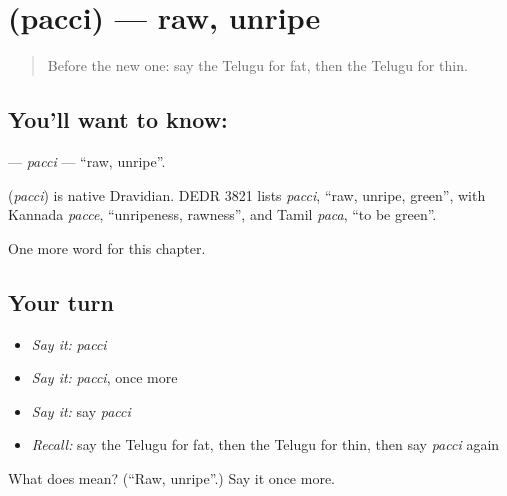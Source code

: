 \section[\texorpdfstring{\te{పచ్చి} (pacci)}{పచ్చి (pacci)}]{ (pacci) — raw, unripe}

\label{lesson:TE-C220-pacci}



\begin{quote}
Before the new one: say the Telugu for fat, then the Telugu for thin.
\end{quote}

\subsection*{You'll want to know: }
\textbf{} — \emph{pacci} — \textquotedblleft{}raw, unripe\textquotedblright{}.

\begin{cousinweb}
\textbf{} (\emph{pacci}) is native Dravidian. DEDR 3821 lists \emph{pacci}, \textquotedblleft{}raw, unripe, green\textquotedblright{}, with Kannada \emph{pacce}, \textquotedblleft{}unripeness, rawness\textquotedblright{}, and Tamil \emph{paca}, \textquotedblleft{}to be green\textquotedblright{}.
\end{cousinweb}

\begin{grammarlens}[title={What you've built}]
One more word for this chapter.
\end{grammarlens}

\subsection*{Your turn}
\begin{itemize}
\raggedright
  \item \emph{Say it:} \emph{pacci}
  \item \emph{Say it:} \emph{pacci}, once more
  \item \emph{Say it:} say \emph{pacci}
  \item \emph{Recall:} say the Telugu for fat, then the Telugu for thin, then say \emph{pacci} again
\end{itemize}

\begin{tcolorbox}[breakable,colback=teal!4,colframe=teal!35!black,title={Before you move on}]
What does  mean? (\textquotedblleft{}Raw, unripe\textquotedblright{}.) Say it once more.
\end{tcolorbox}

